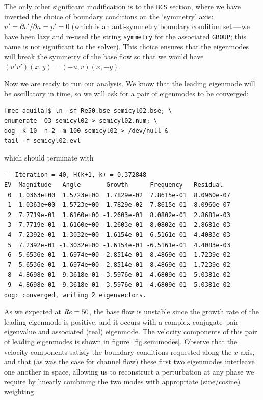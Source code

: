 \documentclass[11pt,a4paper]{report}
\newcommand\Rey{\mbox{\textit{Re}}}
\newcommand\cc{complex-conjugate}
\begin{document}
The only other significant modification is to the \verb+BCS+ section,
where we have inverted the choice of boundary conditions on the
`symmetry' axis: $u'=\partial v'/\partial n=p'=0$ (which is an
anti-symmetry boundary condition set\,---\,we have been lazy and
re-used the string \verb+symmetry+ for the associated \verb+GROUP+;
this name is not significant to the solver).  This choice ensures that
the eigenmodes will break the symmetry of the base flow so that we
would have $(u'v')(x,y)=(-u,v)(x,-y)$.

Now we are ready to run our analysis. We know that the leading
eigenmode will be oscillatory in time, so we will ask for a pair of
eigenmodes to be converged:
\begin{verbatim}
[mec-aquila]$ ln -sf Re50.bse semicyl02.bse; \
enumerate -O3 semicyl02 > semicyl02.num; \
dog -k 10 -n 2 -m 100 semicyl02 > /dev/null &
tail -f semicyl02.evl
\end{verbatim}
which should terminate with
{\small
\begin{verbatim}
-- Iteration = 40, H(k+1, k) = 0.372848
EV  Magnitude   Angle       Growth      Frequency   Residual
 0  1.0363e+00  1.5723e+00  1.7829e-02  7.8615e-01  8.0960e-07
 1  1.0363e+00 -1.5723e+00  1.7829e-02 -7.8615e-01  8.0960e-07
 2  7.7719e-01  1.6160e+00 -1.2603e-01  8.0802e-01  2.8681e-03
 3  7.7719e-01 -1.6160e+00 -1.2603e-01 -8.0802e-01  2.8681e-03
 4  7.2392e-01  1.3032e+00 -1.6154e-01  6.5161e-01  4.4083e-03
 5  7.2392e-01 -1.3032e+00 -1.6154e-01 -6.5161e-01  4.4083e-03
 6  5.6536e-01  1.6974e+00 -2.8514e-01  8.4869e-01  1.7239e-02
 7  5.6536e-01 -1.6974e+00 -2.8514e-01 -8.4869e-01  1.7239e-02
 8  4.8698e-01  9.3618e-01 -3.5976e-01  4.6809e-01  5.0381e-02
 9  4.8698e-01 -9.3618e-01 -3.5976e-01 -4.6809e-01  5.0381e-02
dog: converged, writing 2 eigenvectors.
\end{verbatim}
}
\noindent
As we expected at $\Rey=50$, the base flow is unstable since the
growth rate of the leading eigenmode is positive, and it occurs with a
\cc\ pair eigenvalue and associated (real) eigenmode.  The velocity
components of this pair of leading eigenmodes is shown in
figure~\ref{fig.semimodes}.  Observe that the velocity components
satisfy the boundary conditions requested along the $x$-axis, and that
(as was the case for channel flow) these first two eigenmodes
interleave one another in space, allowing us to reconstruct a
perturbation at any phase we require by linearly combining the two
modes with appropriate (sine/cosine) weighting.
\end{document}
